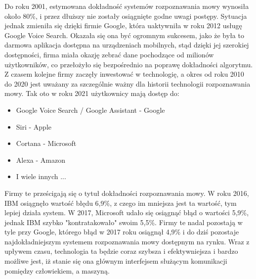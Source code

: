\documentclass[12pt, a4paper]{article}
\begin{document}
\begin{sloppypar}
{{    Do roku 2001, estymowana dokładność systemów rozpoznawania mowy wynosiła około 80\%,
    i przez dłuższy nie zostały osiągnięte godne uwagi postępy. Sytuacja jednak
    zmieniła się dzięki firmie Google, która uaktywniła w roku 2012 usługę Google 
    Voice Search. Okazała się ona być ogromnym sukcesem, jako że była to darmowa 
    aplikacja dostępna na urządzeniach mobilnych, stąd dzięki jej szerokiej dostępności,
    firma miała okazję zebrać dane pochodzące od milionów użytkowników, co przełożyło
    się bezpośrednio na poprawę dokładności algorytmu. Z czasem kolejne firmy
    zaczęły inwestować w technologię, a okres od roku 2010 do 2020 jest uważany za
    szczególnie ważny dla historii technologii rozpoznawania mowy. Tak oto w roku 2021
    użytkownicy mają dostęp do:
    \begin{itemize}
      \item Google Voice Search / Google Assistant - Google 
      \item Siri - Apple
      \item Cortana - Microsoft
      \item Alexa - Amazon
      \item I wiele innych ...
    \end{itemize}
    Firmy te prześcigają się o tytuł dokładności rozpoznawania mowy. W roku 2016, IBM
    osiągnęło wartość błędu 6,9\%, z czego im mniejsza jest ta wartość, tym lepiej działa
    system. W 2017, Microsoft udało się osiągnąć błąd o
    wartości 5,9\%, jednak IBM szybko "kontratakowało" swoim 5,5\%. Firmy te
    nadal pozostają w tyle przy Google, którego błąd w 2017 roku osiągnął 4,9\% i do
    dziś pozostaje najdokładniejszym systemem rozpoznawania mowy dostępnym na rynku.
    Wraz z upływem czasu, technologia ta będzie coraz szybsza i
    efektywniejsza i bardzo możliwe jest, iż stanie się ona głównym interfejsem służącym
    komunikacji pomiędzy człowiekiem, a maszyną. 

}}
\end{sloppypar}
\end{document}
